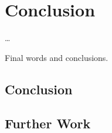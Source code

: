 \chapter{Conclusion} \label{chap:conclusion}

\ifpdf
    \graphicspath{{7/figures/PNG/}{7/figures/PDF/}{7/figures/}}
\else
    \graphicspath{{7/figures/EPS/}{7/figures/}}
\fi

\dots

Final words and conclusions.

\section{Conclusion}

\section{Further Work}